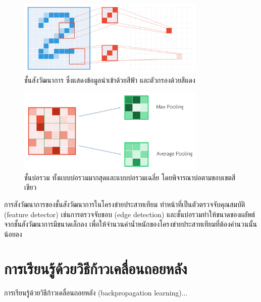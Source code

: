 \documentclass{cpereport}
\begin{document}
\begin{figure}
    \centering
    \includegraphics[width=0.8\textwidth]{images/convolution.pdf}
    \caption{ชั้นสังวัฒนาการ ซึ่งแสดงข้อมูลนำเข้าด้วยสีฟ้า และตัวกรองด้วยสีแดง}
    \label{conv-figure}
\end{figure}
\begin{figure}
    \centering
    \includegraphics[width=0.8\textwidth]{images/pool.pdf}
    \caption{ชั้นบ่อรวม ทั้งแบบบ่อรวมมากสุดและแบบบ่อรวมเฉลี่ย โดยพิจารณาบ่อตามขอบเขตสีเขียว}
    \label{pool-figure}
\end{figure}
การสังวัฒนาการของชั้นสังวัฒนาการในโครงข่ายประสาทเทียม ทำหน้าที่เป็นตัวตรวจจับคุณสมบัติ (feature detector) เช่นการตรวจจับขอบ (edge detection) และชั้นบ่อรวมทำให้ขนาดของผลัพธ์จากชั้นสังวัฒนาการมีขนาดเล็กลง เพื่อให้จำนวนค่าน้ำหนักของโครงข่ายประสาทเทียมที่ต้องคำนวนนั้นน้อยลง

\section{การเรียนรู้ด้วยวิธีก้าวเคลื่อนถอยหลัง}

การเรียนรู้ด้วยวิธีก้าวเคลื่อนถอยหลัง (backpropagation learning)...

 

\end{document}
